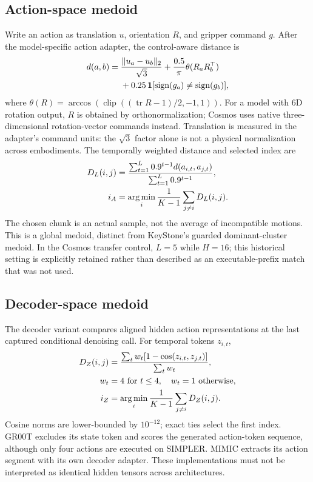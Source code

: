 \subsection{Action-space medoid}
Write an action as translation $u$, orientation $R$, and gripper command $g$.
After the model-specific action adapter, the control-aware distance is
\begin{equation}
\begin{split}
d(a,b)={}&\frac{\|u_a-u_b\|_2}{\sqrt3}
+\frac{0.5}{\pi}\theta(R_aR_b^\top)\\
&+0.25\,\mathbf{1}[\operatorname{sign}(g_a)\ne\operatorname{sign}(g_b)],
\end{split}
\end{equation}
where $\theta(R)=\arccos(\operatorname{clip}((\operatorname{tr}R-1)/2,-1,1))$.
For a model with 6D rotation output, $R$ is obtained by orthonormalization;
Cosmos uses native three-dimensional rotation-vector commands instead.
Translation is measured in the adapter's command units: the $\sqrt3$
factor alone is not a physical normalization across embodiments.
The temporally weighted distance and selected index are
\begin{align}
D_L(i,j)&=\frac{\sum_{t=1}^{L}0.9^{t-1}d(a_{i,t},a_{j,t})}
{\sum_{t=1}^{L}0.9^{t-1}},\\
i_A&=\operatorname*{arg\,min}_i\frac1{K-1}\sum_{j\ne i}D_L(i,j).
\end{align}
The chosen chunk is an actual sample, not the average of incompatible motions.
This is a global medoid, distinct from KeyStone's guarded dominant-cluster
medoid. In the Cosmos transfer control, $L=5$ while $H=16$; this historical
setting is explicitly retained rather than described as an executable-prefix
match that was not used.

\subsection{Decoder-space medoid}
The decoder variant compares aligned hidden action representations at the
last captured conditional denoising call. For temporal tokens $z_{i,t}$,
\begin{align}
D_Z(i,j)&=\frac{\sum_t w_t[1-\cos(z_{i,t},z_{j,t})]}{\sum_t w_t},\\
w_t&=4\ \text{for }t\le4,\quad w_t=1\ \text{otherwise},\\
i_Z&=\operatorname*{arg\,min}_i\frac1{K-1}\sum_{j\ne i}D_Z(i,j).
\end{align}
Cosine norms are lower-bounded by $10^{-12}$; exact ties select the first
index. GR00T excludes its state token and scores the generated action-token
sequence, although only four actions are executed on SIMPLER. MIMIC extracts
its action segment with its own decoder adapter. These implementations
must not be interpreted as identical hidden tensors across architectures.

